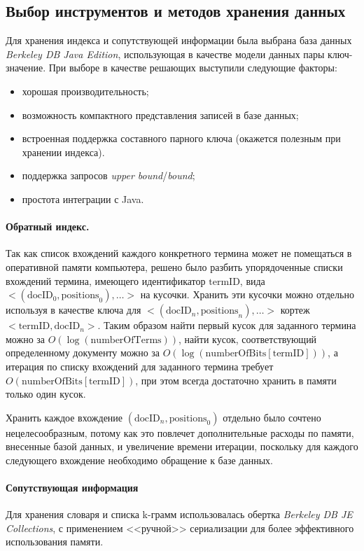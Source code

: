 \documentclass[12pt]{article}
\begin{document}
\subsection{Выбор инструментов и методов хранения данных}
Для хранения индекса и сопутствующей информации была выбрана база данных
\emph{Berkeley DB Java Edition}, использующая в качестве модели данных пары ключ-значение.
При выборе в качестве решающих выступили следующие факторы:
\begin{itemize}
\item хорошая производительность;
\item возможность компактного представления записей в базе данных;
\item встроенная поддержка составного парного ключа (окажется полезным при хранении индекса).
\item поддержка запросов \emph{upper bound}/\emph{bound};
\item простота интеграции с Java.
\end{itemize}

\paragraph{Обратный индекс.} Так как список вхождений каждого конкретного термина может 
не помещаться в оперативной памяти компьютера, решено было разбить 
упорядоченные списки вхождений термина, имеющего идентификатор $\mathrm{termID}$, вида 
$<(\mathrm{docID}_0, \mathrm{positions}_0), \ldots>$ на кусочки. 
Хранить эти кусочки можно отдельно используя в качестве ключа для
$<(\mathrm{docID}_n, \mathrm{positions}_n), \ldots>$
кортеж $<\mathrm{termID}, \mathrm{docID}_n>$. Таким образом найти 
первый кусок для заданного термина можно за $O(\log(\mathrm{numberOfTerms}))$, 
найти кусок, соответствующий определенному документу
можно за $O(\log(\mathrm{numberOfBits}[\mathrm{termID}]))$, а итерация по списку 
вхождений для заданного термина требует $O(\mathrm{numberOfBits}[\mathrm{termID}])$, 
при этом всегда достаточно хранить в памяти только один кусок.

Хранить каждое вхождение $(\mathrm{docID}_n, \mathrm{positions}_0)$ отдельно 
было сочтено нецелесообразным, потому как это повлечет дополнительные расходы по памяти, внесенные
базой данных, и увеличение времени итерации, поскольку для каждого следующего вхождение 
необходимо обращение к базе данных.

\paragraph{Сопутствующая информация} Для хранения словаря и списка k-грамм
использовалась обертка \emph{Berkeley DB JE Collections}, с применением <<ручной>> сериализации для
более эффективного использования памяти.
\end{document}
